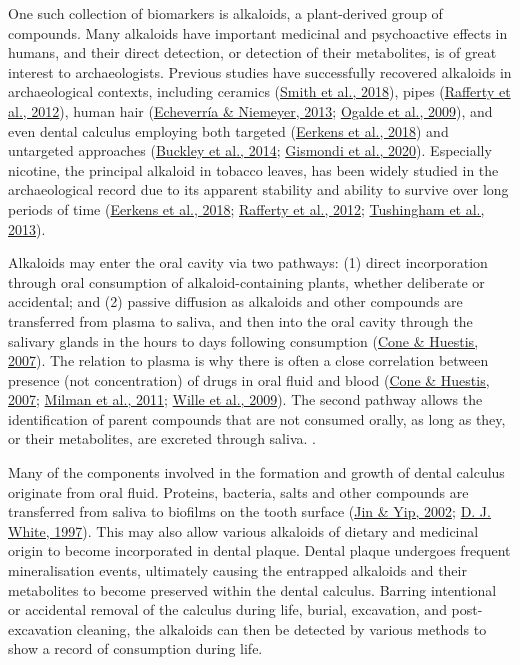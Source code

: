 \documentclass[
  letterpaper,
]{book}
\begin{document}
One such collection of biomarkers is alkaloids, a plant-derived group of
compounds. Many alkaloids have important medicinal and psychoactive
effects in humans, and their direct detection, or detection of their
metabolites, is of great interest to archaeologists. Previous studies
have successfully recovered alkaloids in archaeological contexts,
including ceramics
(\protect\hyperlink{ref-smithDetectionOpium2018}{Smith et al., 2018}),
pipes (\protect\hyperlink{ref-raffertyCurrentResearch2012}{Rafferty et
al., 2012}), human hair
(\protect\hyperlink{ref-echeverriaNicotineHair2013}{Echeverría \&
Niemeyer, 2013};
\protect\hyperlink{ref-ogaldeIdentificationPsychoactive2009}{Ogalde et
al., 2009}), and even dental calculus employing both targeted
(\protect\hyperlink{ref-eerkensDentalCalculus2018}{Eerkens et al.,
2018}) and untargeted approaches
(\protect\hyperlink{ref-buckleyDentalCalculus2014}{Buckley et al.,
2014};
\protect\hyperlink{ref-gismondiMultidisciplinaryApproach2020}{Gismondi
et al., 2020}). Especially nicotine, the principal alkaloid in tobacco
leaves, has been widely studied in the archaeological record due to its
apparent stability and ability to survive over long periods of time
(\protect\hyperlink{ref-eerkensDentalCalculus2018}{Eerkens et al.,
2018}; \protect\hyperlink{ref-raffertyCurrentResearch2012}{Rafferty et
al., 2012};
\protect\hyperlink{ref-tushinghamHuntergathererTobacco2013}{Tushingham
et al., 2013}).

Alkaloids may enter the oral cavity via two pathways: (1) direct
incorporation through oral consumption of alkaloid-containing plants,
whether deliberate or accidental; and (2) passive diffusion as alkaloids
and other compounds are transferred from plasma to saliva, and then into
the oral cavity through the salivary glands in the hours to days
following consumption
(\protect\hyperlink{ref-coneInterpretationOral2007}{Cone \& Huestis,
2007}). The relation to plasma is why there is often a close correlation
between presence (not concentration) of drugs in oral fluid and blood
(\protect\hyperlink{ref-coneInterpretationOral2007}{Cone \& Huestis,
2007}; \protect\hyperlink{ref-milmanOralFluid2011}{Milman et al., 2011};
\protect\hyperlink{ref-willeRelationshipOral2009}{Wille et al., 2009}).
The second pathway allows the identification of parent compounds that
are not consumed orally, as long as they, or their metabolites, are
excreted through saliva. .

Many of the components involved in the formation and growth of dental
calculus originate from oral fluid. Proteins, bacteria, salts and other
compounds are transferred from saliva to biofilms on the tooth surface
(\protect\hyperlink{ref-jinSupragingivalCalculus2002}{Jin \& Yip, 2002};
\protect\hyperlink{ref-whiteDentalCalculus1997}{D. J. White, 1997}).
This may also allow various alkaloids of dietary and medicinal origin to
become incorporated in dental plaque. Dental plaque undergoes frequent
mineralisation events, ultimately causing the entrapped alkaloids and
their metabolites to become preserved within the dental calculus.
Barring intentional or accidental removal of the calculus during life,
burial, excavation, and post-excavation cleaning, the alkaloids can then
be detected by various methods to show a record of consumption during
life.
\end{document}

